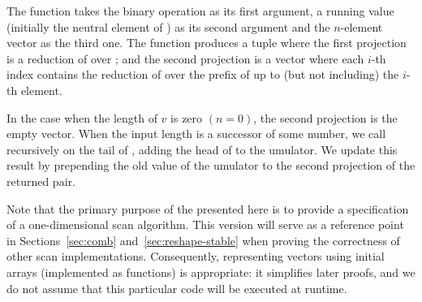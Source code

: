 The function takes the binary operation  as its first argument,
a running value  (initially the neutral element of )
as its second argument and the $n$-element vector 
as the third one.  The function produces a tuple where the first projection
is a reduction of  over ; and the second projection
is a vector where each $i$-th index contains the reduction of 
over the prefix of  up to (but not including) the $i$-th
element.

In the case when the length of $v$ is zero
$(n = 0)$, the second projection is the empty vector.
When the input length is a successor of some number,
we call  recursively on the tail of , adding the head of
 to the umulator.  We update this result by prepending
the old value of the umulator to the second projection of the
returned pair.


Note that the primary purpose of the  presented here is to provide a
specification of a one-dimensional scan algorithm.  This version will serve as
a reference point in Sections~\ref{sec:comb} and~\ref{sec:reshape-stable} when
proving the correctness of other scan implementations.  Consequently,
representing vectors using initial arrays (implemented as functions) is
appropriate: it simplifies later proofs, and we do not assume that this
particular code will be executed at runtime.

